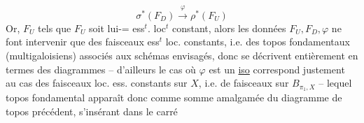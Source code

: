 \[
\boxed{\sigma^{*}(F_D)\xrightarrow{\varphi}\rho^{*}(F_U)}
\]
Or,   $F_U$ tels que $F_U$ soit
lui-= ess$^{t}$. loc$^{t}$ constant, alors les données
$F_U,F_D,\varphi$ ne font intervenir que des
faisceaux ess$^{t}$ loc. constants, i.e. des
topos fondamentaux (multigaloisiens)
associés aux schémas envisagés,  donc
se décrivent entièrement en termes des
diagrammes
\margin{(*)}
-- d'ailleurs le cas où $\varphi$ est un \uline{iso} correspond
justement au cas des faisceaux loc. ess.
constants sur $X$, i.e. de faisceaux sur
$B_{\pi_1,X}$ -- lequel topos fondamental
apparaît donc comme somme
amalgamée du diagramme de topos
précédent, s'insérant dans le carré

